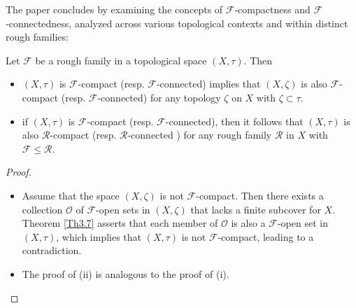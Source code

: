 \documentclass[11pt]{amsart}
\begin{document}
The paper concludes by examining the concepts of $\mathscr{F}$‑compactness and $\mathscr{F}$‑connectedness, analyzed across various topological contexts and within distinct rough families:
\begin{theorem}\label{Th6.5} Let $\mathscr{F}$ be a rough family in a topological space $(X,\tau)$. Then \begin{itemize}
    \item[(i)] $(X,\tau)$ is $\mathscr{F}$-compact (resp. $\mathscr{F}$-connected) implies that $(X,\zeta)$ is also $\mathscr{F}$-compact (resp. $\mathscr{F}$-connected) for any topology $\zeta$ on $X$ with $\zeta\subset \tau$.
    
    \item[(ii)] if $(X,\tau)$ is $\mathscr{F}$-compact (resp. $\mathscr{F}$-connected), then it follows that $(X,\tau)$ is also $\mathscr{R}$-compact (resp. $\mathscr{R}$-connected ) for any rough family $\mathscr{R}$ in $X$ with $\mathscr{F}\leq \mathscr{R}$.
\end{itemize}
\end{theorem}

\begin{proof}\begin{itemize}
    \item[(i)] Assume that the space $(X,\zeta)$ is not $\mathscr{F}$-compact. Then there exists a collection $\mathcal{O}$ of $\mathscr{F}$-open sets in $(X,\zeta)$ that lacks a finite subcover for $X$. Theorem \ref{Th3.7} asserts that each member of $\mathcal{O}$ is also a $\mathscr{F}$-open set in $(X,\tau)$, which implies that $(X,\tau)$ is not $\mathscr{F}$-compact, leading to a contradiction.

    \item[(ii)] The proof of (ii) is analogous to the proof of (i).
\end{itemize}
    
\end{proof}
\end{document}

